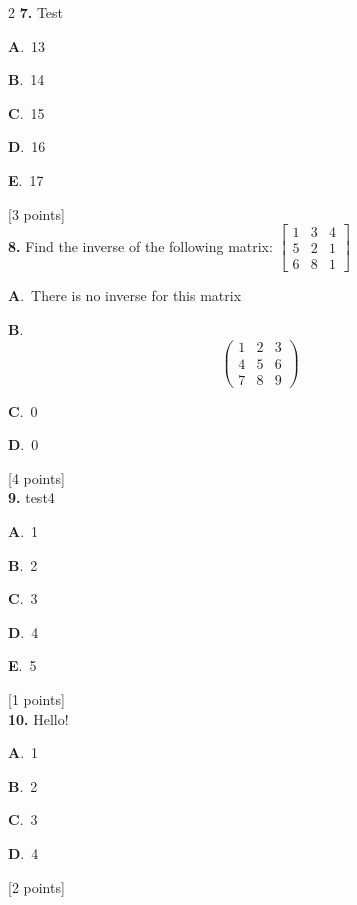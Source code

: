\documentclass[12pt]{article}
\newcommand{\choice}[3]{%
  \noindent\textbf{#1}.~#2\hfill#3\par\vspace{0.25em}
}
\begin{document}
\begin{multicols}{2}
\noindent \textbf{\textenglish{7.}} {\textenglish{Test}}

\noindent\choice{A}{{\textenglish{13}}}{}
\noindent\choice{B}{{\textenglish{14}}}{}
\noindent\choice{C}{{\textenglish{15}}}{}
\noindent\choice{D}{{\textenglish{16}}}{}
\noindent\choice{E}{{\textenglish{17}}}{}
\hfill {\textenglish{[3 points]}}\\[0.5em]

\noindent \textbf{\textenglish{8.}} {\textenglish{Find the inverse of the following matrix: }}\(\begin{bmatrix} 1 & 3 & 4 \\ 5 & 2 & 1 \\ 6 & 8 & 1 \end{bmatrix}\)

\noindent\choice{A}{{\textenglish{There is no inverse for this matrix}}}{}
\noindent\choice{B}{\[\begin{pmatrix} 1 & 2 & 3 \\ 4 & 5 & 6 \\ 7 & 8 & 9  \end{pmatrix}\]}{}
\noindent\choice{C}{{\textenglish{0}}}{}
\noindent\choice{D}{{\textenglish{0}}}{}
\hfill {\textenglish{[4 points]}}\\[0.5em]

\noindent \textbf{\textenglish{9.}} {\textenglish{test4}}

\noindent\choice{A}{{\textenglish{1}}}{}
\noindent\choice{B}{{\textenglish{2}}}{}
\noindent\choice{C}{{\textenglish{3}}}{}
\noindent\choice{D}{{\textenglish{4}}}{}
\noindent\choice{E}{{\textenglish{5}}}{}
\hfill {\textenglish{[1 points]}}\\[0.5em]

\noindent \textbf{\textenglish{10.}} {\textenglish{Hello!}}

\noindent\choice{A}{{\textenglish{1}}}{}
\noindent\choice{B}{{\textenglish{2}}}{}
\noindent\choice{C}{{\textenglish{3}}}{}
\noindent\choice{D}{{\textenglish{4}}}{}
\hfill {\textenglish{[2 points]}}\\[0.5em]


\end{multicols}
\end{document}
